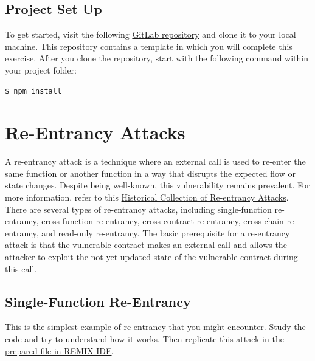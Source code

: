 \documentclass[12pt]{article}
\begin{document}

\subsection*{Project Set Up}

To get started, visit the following \href{https://gitlab.fel.cvut.cz/radovluk/smart-contracts-exercises/-/tree/main/05-Re-Entrancy/task/task-code}{GitLab repository} and clone it to your local machine. This repository contains a template in which you will complete this exercise. After you clone the repository, start with the following command within your project folder:

\begin{verbatim}
$ npm install
\end{verbatim}

\section{Re-Entrancy Attacks}

A re-entrancy attack is a technique where an external call is used to re-enter the same function or another function in a way that disrupts the expected flow or state changes. Despite being well-known, this vulnerability remains prevalent. For more information, refer to this \href{https://github.com/pcaversaccio/reentrancy-attacks?tab=readme-ov-file}{Historical Collection of Re-entrancy Attacks}. There are several types of re-entrancy attacks, including single-function re-entrancy, cross-function re-entrancy, cross-contract re-entrancy, cross-chain re-entrancy, and read-only re-entrancy. The basic prerequisite for a re-entrancy attack is that the vulnerable contract makes an external call and allows the attacker to exploit the not-yet-updated state of the vulnerable contract during this call.

\subsection{Single-Function Re-Entrancy}

This is the simplest example of re-entrancy that you might encounter. Study the code and try to understand how it works. Then replicate this attack in the \href{https://remix.ethereum.org/?#activate=solidity&url=https://github.com/radovluk/unbreakable-vault/contracts/reentrancy01.sol&lang=en&optimize=false&runs=200&evmVersion=null&version=soljson-v0.8.28+commit.7893614a.js}{prepared file in REMIX IDE}.
\end{document}
